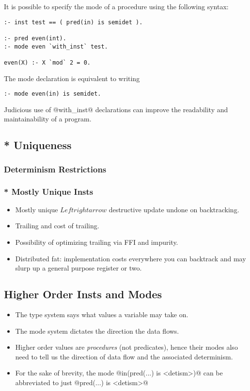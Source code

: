 It is possible to specify the mode of a procedure using the
following syntax:
\begin{verbatim}
:- inst test == ( pred(in) is semidet ).

:- pred even(int).
:- mode even `with_inst` test.

even(X) :- X `mod` 2 = 0.
\end{verbatim}
The mode declaration is equivalent to writing
\begin{verbatim}
:- mode even(in) is semidet.
\end{verbatim}


Judicious use of @with_inst@ declarations can improve the
readability and maintainability of a program.

\subsection{* Uniqueness}
\subsubsection{Determinism Restrictions}


\subsubsection{* Mostly Unique Insts}

\begin{itemize}
\item Mostly unique $Leftrightarrow$ destructive update undone on
  backtracking.
\item Trailing and cost of trailing.
\item Possibility of optimizing trailing via FFI and impurity.
\item Distributed fat: implementation costs everywhere you can
  backtrack and may slurp up a general purpose register or
  two.
\end{itemize}

\subsection{Higher Order Insts and Modes}

\begin{itemize}
\item The type system says what values a variable may take on.
\item The mode system dictates the direction the data flows.
\item Higher order values are \emph{procedures} (not predicates), hence
  their modes also need to tell us the direction of data flow
  and the associated determinism.  
\item For the sake of brevity, the mode @in(pred(...) is <detism>)@
  can be abbreviated to just @pred(...) is <detism>@
\end{itemize}


